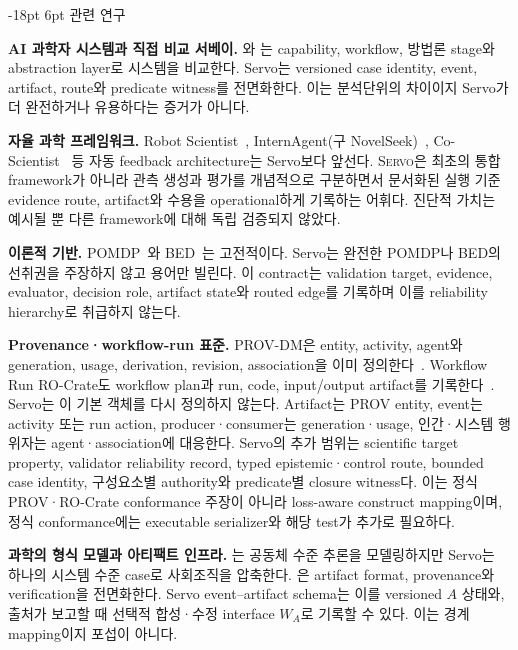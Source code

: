 \documentclass[11pt]{article}
\makeatletter
\renewcommand\section{\@startsection{section}{1}{\z@}%
  {-18pt \@plus -4pt \@minus -2pt}%
  {6pt \@plus 2pt}%
  {\normalfont\large\bfseries}}
\newcommand{\framework}{\textsc{Servo}}
\makeatother
\begin{document}
\section{관련 연구}
\label{sec:related}

\textbf{AI 과학자 시스템과 직접 비교 서베이.} \citet{wei2025agenticscience}와 \citet{tie2025survey}는 capability, workflow, 방법론 stage와 abstraction layer로 시스템을 비교한다. Servo는 versioned case identity, event, artifact, route와 predicate witness를 전면화한다. 이는 분석단위의 차이이지 Servo가 더 완전하거나 유용하다는 증거가 아니다.

\textbf{자율 과학 프레임워크.} Robot Scientist~\citep{sparkes2010robot}, InternAgent(구 NovelSeek)~\citep{zhang2025novelseek}, Co-Scientist~\citep{gottweis2026coscientist} 등 자동 feedback architecture는 Servo보다 앞선다. \framework{}은 최초의 통합 framework가 아니라 관측 생성과 평가를 개념적으로 구분하면서 문서화된 실행 기준 evidence route, artifact와 수용을 operational하게 기록하는 어휘다. 진단적 가치는 예시될 뿐 다른 framework에 대해 독립 검증되지 않았다.

\textbf{이론적 기반.} POMDP~\citep{kaelbling1998pomdp}와 BED~\citep{chaloner1995bayesian,rainforth2024modern}는 고전적이다. Servo는 완전한 POMDP나 BED의 선취권을 주장하지 않고 용어만 빌린다. 이 contract는 validation target, evidence, evaluator, decision role, artifact state와 routed edge를 기록하며 이를 reliability hierarchy로 취급하지 않는다.

\textbf{Provenance·workflow-run 표준.} PROV-DM은 entity, activity, agent와 generation, usage, derivation, revision, association을 이미 정의한다~\citep{w3cprov2013}. Workflow Run RO-Crate도 workflow plan과 run, code, input/output artifact를 기록한다~\citep{workflowruncrate2023}. Servo는 이 기본 객체를 다시 정의하지 않는다. Artifact는 PROV entity, event는 activity 또는 run action, producer·consumer는 generation·usage, 인간·시스템 행위자는 agent·association에 대응한다. Servo의 추가 범위는 scientific target property, validator reliability record, typed epistemic·control route, bounded case identity, 구성요소별 authority와 predicate별 closure witness다. 이는 정식 PROV·RO-Crate conformance 주장이 아니라 loss-aware construct mapping이며, 정식 conformance에는 executable serializer와 해당 test가 추가로 필요하다.

\textbf{과학의 형식 모델과 아티팩트 인프라.} \citet{taniguchi2024cpc}는 공동체 수준 추론을 모델링하지만 Servo는 하나의 시스템 수준 case로 사회조직을 압축한다. \citet{liu2026lasthuman}은 artifact format, provenance와 verification을 전면화한다. Servo event--artifact schema는 이를 versioned $A$ 상태와, 출처가 보고할 때 선택적 합성·수정 interface $W_A$로 기록할 수 있다. 이는 경계 mapping이지 포섭이 아니다.
\end{document}
